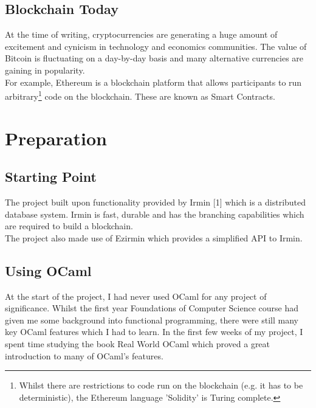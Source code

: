 \documentclass[12pt,a4paper,twoside,openright]{report}
\begin{document}
	\section{Blockchain Today}
	At the time of writing, cryptocurrencies are generating a huge amount of excitement and cynicism in technology and economics communities. The value of Bitcoin is fluctuating on a day-by-day basis and many alternative currencies are gaining in popularity.\\
	For example, Ethereum is a blockchain platform that allows participants to run arbitrary\footnote{Whilst there are restrictions to code run on the blockchain (e.g. it has to be deterministic), the Ethereum language 'Solidity' is Turing complete.} code on the blockchain. These are known as Smart Contracts.

	\chapter{Preparation}
	\section{Starting Point}
		The project built upon functionality provided by Irmin [1] which is a distributed database system.  Irmin is fast, durable and has the branching capabilities which are required to build a blockchain.\\
		The project also made use of Ezirmin \cite{Ezirmin} which provides a simplified API to Irmin.\\
	\section{Using OCaml}
		At the start of the project, I had never used OCaml for any project of significance. 
		Whilst the first year Foundations of Computer Science course had given me some background into functional programming, there were still many key OCaml features which I had to learn.
		In the first few weeks of my project, I spent time studying the book Real World OCaml \cite{RealWorldOCaml} which proved a great introduction to many of OCaml's features.  
\end{document}
